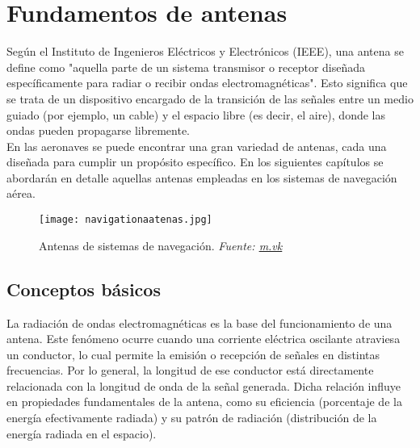 

\chapter{Fundamentos de antenas}
\chapterspaceabove{6.75cm} %
\chapterspacebelow{7.25cm} %

Según el Instituto de Ingenieros Eléctricos y Electrónicos (IEEE), una antena se define como "aquella parte de un sistema transmisor o receptor diseñada específicamente para radiar o recibir ondas electromagnéticas". Esto significa que se trata de un dispositivo encargado de la transición de las señales entre un medio guiado (por ejemplo, un cable) y el espacio libre (es decir, el aire), donde las ondas pueden propagarse libremente.\\

En las aeronaves se puede encontrar una gran variedad de antenas, cada una diseñada para cumplir un propósito específico. En los siguientes capítulos se abordarán en detalle aquellas antenas empleadas en los sistemas de navegación aérea.

\begin{figure}[H]
    \centering
    \texttt{[image: navigationaatenas.jpg]}
    \caption{\centering Antenas de sistemas de navegación. \textit{Fuente: \href{https://m.vk.com}{m.vk}}}
    \label{fig:bcpfsk1}
\end{figure}

\section{Conceptos básicos}

La radiación de ondas electromagnéticas es la base del funcionamiento de una antena. Este fenómeno ocurre cuando una corriente eléctrica oscilante atraviesa un conductor, lo cual permite la emisión o recepción de señales en distintas frecuencias. Por lo general, la longitud de ese conductor está directamente relacionada con la longitud de onda de la señal generada. Dicha relación influye en propiedades fundamentales de la antena, como su eficiencia (porcentaje de la energía efectivamente radiada) y su patrón de radiación (distribución de la energía radiada en el espacio).\\


